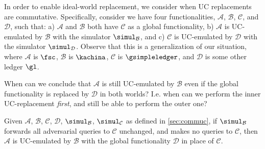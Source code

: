 In order to enable ideal-world replacement, we consider when UC replacements are
commutative. Specifically, consider we have four functionalities, $\mathcal{A}$,
$\mathcal{B}$, $\mathcal{C}$, and $\mathcal{D}$, such that: a) $\mathcal{A}$ and
$\mathcal{B}$ both have $\mathcal{C}$ as a global functionality, b)
$\mathcal{A}$ is UC-emulated by $\mathcal{B}$ with the simulator
$\simul_{\mathcal{B}}$, and c) $\mathcal{C}$ is UC-emulated by $\mathcal{D}$
with the simulator $\simul_{\mathcal{D}}$. Observe that this is a generalization
of our situation, where $\mathcal{A}$ is $\fsc$, $\mathcal{B}$ is $\kachina$,
$\mathcal{C}$ is $\gsimpleledger$, and $\mathcal{D}$ is some other ledger $\gl$.

When can we conclude that $\mathcal{A}$ is still UC-emulated by $\mathcal{B}$
even if the global functionality is replaced by $\mathcal{D}$ in both worlds?
I.e. when can we perform the inner UC-replacement \emph{first}, and still be
able to perform the outer one?

\begin{theorem}
  Given $\mathcal{A}$, $\mathcal{B}$, $\mathcal{C}$, $\mathcal{D}$,
  $\simul_{\mathcal{B}}$, $\simul_{\mathcal{C}}$ as defined in
  \autoref{sec:commuc}, if $\simul_{\mathcal{B}}$ forwards all adversarial
  queries to $\mathcal{C}$ unchanged, and makes no queries to
  $\mathcal{C}$, then $\mathcal{A}$ is UC-emulated by $\mathcal{B}$ with the
  global functionality $\mathcal{D}$ in place of $\mathcal{C}$.
  \label{thm:commuc}
\end{theorem}

